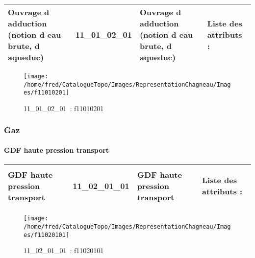\documentclass[12pt,titlepage]{book}
\begin{document}
\renewcommand{\arraystretch}{1.2}
\begin{supertabular}{|p{10cm}|c|p{13cm}|p{12cm}|}
 Ouvrage d adduction (notion d eau brute, d aqueduc) & 11\_01\_02\_01 & Ouvrage d adduction (notion d eau brute, d aqueduc) & Liste des attributs :
\begin{enumerate}
\end{enumerate}
\\
\hline
\end{supertabular}
\begin{figure}[h!]
  \hfill         %
  \begin{minipage}[t]{3cm}
    \begin{center}
      \texttt{[image: /home/fred/CatalogueTopo/Images/RepresentationChagneau/Images/f11010201]}
      \caption[~11\_01\_02\_01]{\small{11\_01\_02\_01~:} \tiny{f11010201}}\label{f11010201}
    \end{center}
  \end{minipage}
\end{figure}

\subsubsection{\large Gaz}
\paragraph{GDF haute pression transport}
\noindent
\vspace{\baselineskip}

\renewcommand{\arraystretch}{1.2}
\begin{supertabular}{|p{10cm}|c|p{13cm}|p{12cm}|}
 GDF haute pression transport & 11\_02\_01\_01 & GDF haute pression transport & Liste des attributs :
\begin{enumerate}
\end{enumerate}
\\
\hline
\end{supertabular}
\begin{figure}[h!]
  \hfill         %
  \begin{minipage}[t]{3cm}
    \begin{center}
      \texttt{[image: /home/fred/CatalogueTopo/Images/RepresentationChagneau/Images/f11020101]}
      \caption[~11\_02\_01\_01]{\small{11\_02\_01\_01~:} \tiny{f11020101}}\label{f11020101}
    \end{center}
  \end{minipage}
\end{figure}
\end{document}
